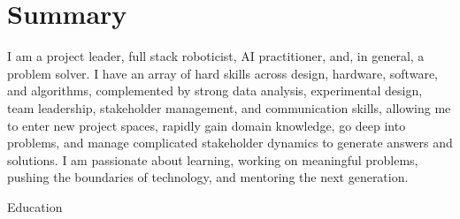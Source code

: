 \documentclass[10pt, letter]{article}
\begin{document}


\section*{Summary}
\hspace*{\fill}\begin{minipage}{\textwidth-\cvindent}
I am a project leader, full stack roboticist, AI practitioner, and, in general, a problem solver.
I have an array of hard skills across design, hardware, software, and algorithms, complemented by strong data analysis, experimental design, team leadership, stakeholder management, and communication skills, allowing me to enter new project spaces, rapidly gain domain knowledge, go deep into problems, and manage complicated stakeholder dynamics to generate answers and solutions. 
I am passionate about learning, working on meaningful problems, pushing the boundaries of technology, and mentoring the next generation.  


\end{minipage}

\begin{cvsection}{Education}




\end{cvsection}
\end{document}
